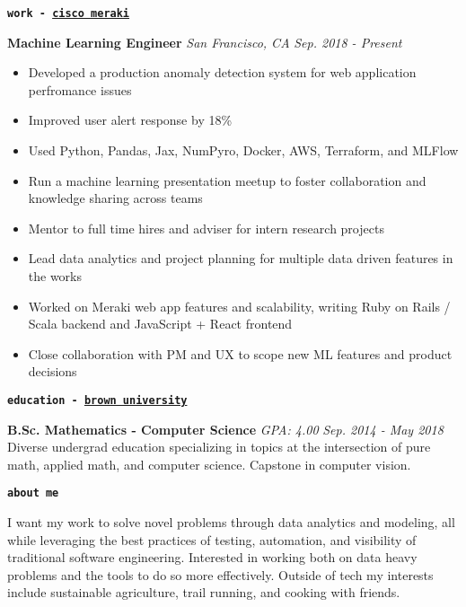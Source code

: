 \documentclass{article}[14pt]
\newenvironment{cvsection}[2] {
  \begin{tcolorbox}[
    standard jigsaw, %
    opacityback=0,   %
    top=0mm,         %
    bottom=0mm,      %
    boxrule=0pt,     %
    enhanced,        %
    frame code={
      \path[draw=#2,line width=3pt]
        (frame.south west) --
        ([yshift=-0.29cm] frame.north west) --
        ([yshift=-0.29cm, xshift=0.2\linewidth] frame.north west);
    }
  ]
  \hspace{0.20\linewidth}
  \textbf{\texttt{\Large{#1}}}
  \large
  \vspace{5pt}
  \newline
}
{ \end{tcolorbox} }
\newenvironment{tightemize}
{\vspace{-2pt}\begin{itemize}[leftmargin=*]\itemsep1pt \parskip0pt \parsep0pt}
{\end{itemize}}
\newcommand{\header}[1]{{\large\textbf{#1}}\newline}
\newcommand{\locationdate}[2]{\textit{#1} \hfill \textit{#2}}
\begin{document}
\vspace{1pt}
\begin{cvsection}{work - \href{https://meraki.cisco.com/}{cisco meraki}}{C1}
  \header{ Machine Learning Engineer }
  \locationdate{San Francisco, CA}{Sep. 2018 - Present}
  \begin{tightemize}
    \item Developed a production anomaly detection system for web application perfromance issues
    \item Improved user alert response by 18\%
    \item Used Python, Pandas, Jax, NumPyro, Docker, AWS, Terraform, and MLFlow
    \item Run a machine learning presentation meetup to foster collaboration and knowledge sharing across teams 
    \item Mentor to full time hires and adviser for intern research projects
    \item Lead data analytics and project planning for multiple data driven features in the works
    \item Worked on Meraki web app features and scalability, writing Ruby on Rails / Scala backend
      and JavaScript + React frontend
    \item Close collaboration with PM and UX to scope new ML features and product decisions
  \end{tightemize}
\end{cvsection}
\vfill
\begin{cvsection}{education - \href{https://www.brown.edu/}{brown university}}{C2}
  \header{B.Sc. Mathematics - Computer Science}
  \locationdate{GPA: 4.00}{Sep. 2014 - May 2018}\\
  Diverse undergrad education specializing in topics at the intersection of pure math, applied math, and computer
  science.
  Capstone in computer vision.\\
\end{cvsection}
\vfill
\begin{cvsection}{about me}{C3}
  I want my work to solve novel problems through data analytics and modeling, all while leveraging the best practices of testing, automation, and visibility of traditional software engineering.
  Interested in working both on data heavy problems and the tools to do so more effectively.
  Outside of tech my interests include sustainable agriculture, trail running, and cooking with
  friends.\\
\end{cvsection}
\end{document}

